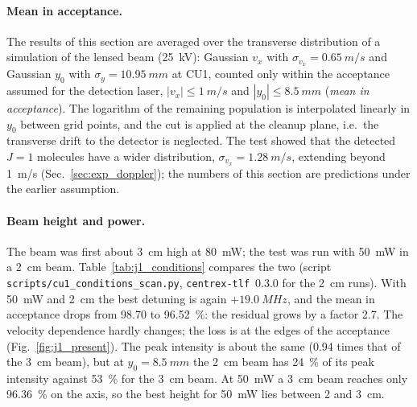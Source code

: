 \documentclass[11pt,a4paper,oneside]{report}
\newcommand{\code}[1]{\texttt{#1}}
\begin{document}
\paragraph{Mean in acceptance.} The results of this section are averaged over the transverse
distribution of a simulation of the lensed beam (\SI{25}{kV}): Gaussian $v_x$ with
$\sigma_{v_x}=\SI{0.65}{m/s}$ and Gaussian $y_0$ with $\sigma_y=\SI{10.95}{mm}$ at CU1, counted only
within the acceptance assumed for the detection laser, $|v_x|\leq\SI{1}{m/s}$ and
$|y_0|\leq\SI{8.5}{mm}$ (\emph{mean in acceptance}). The logarithm of the remaining population is
interpolated linearly in $y_0$ between grid points, and the cut is applied at the cleanup plane,
i.e.\ the transverse drift to the detector is neglected. The test showed that the detected $J=1$
molecules have a wider distribution, $\sigma_{v_x}=\SI{1.28}{m/s}$, extending beyond \SI{1}{m/s}
(Sec.~\ref{sec:exp_doppler}); the numbers of this section are predictions under the earlier
assumption.

\paragraph{Beam height and power.} The beam was first about \SI{3}{cm} high at \SI{80}{mW}; the test
was run with \SI{50}{mW} in a \SI{2}{cm} beam. Table~\ref{tab:j1_conditions} compares the two
(script \code{scripts/cu1\_conditions\_scan.py}, \code{centrex-tlf}~0.3.0 for the \SI{2}{cm}
runs). With \SI{50}{mW} and \SI{2}{cm} the best detuning is again $+\SI{19.0}{MHz}$, and the mean in
acceptance drops from 98.70 to \SI{96.52}{\percent}: the residual grows by a factor 2.7. The velocity
dependence hardly changes; the loss is at the edges of the acceptance (Fig.~\ref{fig:j1_present}).
The peak intensity is about the same (0.94 times that of the \SI{3}{cm} beam), but at
$y_0=\SI{8.5}{mm}$ the \SI{2}{cm} beam has \SI{24}{\percent} of its peak intensity against
\SI{53}{\percent} for the \SI{3}{cm} beam. At \SI{50}{mW} a \SI{3}{cm} beam reaches only
\SI{96.36}{\percent} on the axis, so the best height for \SI{50}{mW} lies between 2 and \SI{3}{cm}.
\end{document}
